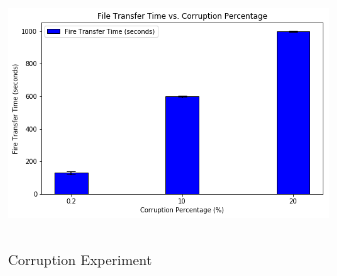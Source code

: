 \documentclass[conference]{IEEEtran}
\begin{document}
\begin{figure}[t]
\includegraphics[width=8.5cm, height=7cm]{experiment-corrupt.png}
 \caption{Corruption Experiment}
 \label{fig:1}
\end{figure}
\end{document}
